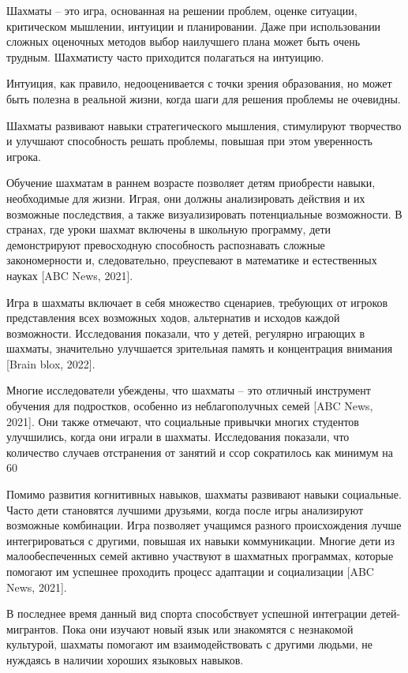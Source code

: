Шахматы – это игра, основанная на решении проблем, оценке ситуации, критическом мышлении, интуиции и планировании. Даже при использовании сложных оценочных методов выбор наилучшего плана может быть очень трудным. Шахматисту часто приходится полагаться на интуицию.

Интуиция, как правило, недооценивается с точки зрения образования, но может быть полезна в реальной жизни, когда шаги для решения проблемы не очевидны.

Шахматы развивают навыки стратегического мышления, стимулируют творчество и улучшают способность решать проблемы, повышая при этом уверенность игрока.

Обучение шахматам в раннем возрасте позволяет детям приобрести навыки, необходимые для жизни. Играя, они должны анализировать действия и их возможные последствия, а также визуализировать потенциальные возможности. В странах, где уроки шахмат включены в школьную программу, дети демонстрируют превосходную способность распознавать сложные закономерности и, следовательно, преуспевают в математике и естественных науках [ABC News, 2021].

Игра в шахматы включает в себя множество сценариев, требующих от игроков представления всех возможных ходов, альтернатив и исходов каждой возможности. Исследования показали, что у детей, регулярно играющих в шахматы, значительно улучшается зрительная память и концентрация внимания [Brain blox, 2022].

Многие исследователи убеждены, что шахматы – это отличный инструмент обучения для подростков, особенно из неблагополучных семей [ABC News, 2021]. Они также отмечают, что социальные привычки многих студентов улучшились, когда они играли в шахматы. Исследования показали, что количество случаев отстранения от занятий и ссор сократилось как минимум на 60%

Помимо развития когнитивных навыков, шахматы развивают навыки социальные. Часто дети становятся лучшими друзьями, когда после игры анализируют возможные комбинации. Игра позволяет учащимся разного происхождения лучше интегрироваться с другими, повышая их навыки коммуникации. Многие дети из малообеспеченных семей активно участвуют в шахматных программах, которые помогают им успешнее проходить процесс адаптации и социализации [ABC News, 2021].

В последнее время данный вид спорта способствует успешной интеграции детей-мигрантов. Пока они изучают новый язык или знакомятся с незнакомой культурой, шахматы помогают им взаимодействовать с другими людьми, не нуждаясь в наличии хороших языковых навыков.

